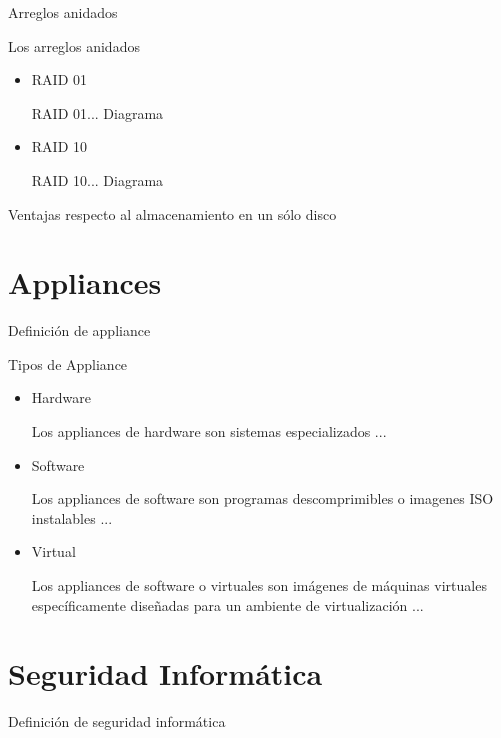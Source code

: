 Arreglos anidados

Los arreglos anidados \cite{3e1f0dad689a7971f226a3ded845ae63}

\begin{itemize}

  \item RAID 01
  
RAID 01... Diagrama \cite{3638d46cd02c0cd72e333c6d6f8f9608}

  \item RAID 10
  
RAID 10... Diagrama \cite{9b286bf9442c2cf4d1e02ddf7322c92b}
  
\end{itemize}

Ventajas respecto al almacenamiento en un s\'{o}lo disco

    \section {Appliances}

Definici\'{o}n de appliance \cite{74e586f4d341588a0bcc6273c524d8f5}

Tipos de Appliance

\begin{itemize}

  \item Hardware
  
Los appliances de hardware son sistemas especializados \cite{dcd32ad713054f2f67fbcd17c0900928}...

  \item Software
  
Los appliances de software son programas descomprimibles o imagenes ISO instalables \cite{4cb5bff4c029d86b328a2126e8a3060f}...
  
  \item Virtual 
  
Los appliances de software o virtuales son im\'{a}genes de m\'{a}quinas virtuales espec\'{i}ficamente dise\~{n}adas para un ambiente de virtualizaci\'{o}n \cite{314f38cbb73bf967a21191775959cf1d}...
  
\end{itemize}

    \section {Seguridad Inform\'{a}tica}
    
Definici\'{o}n de seguridad inform\'{a}tica

